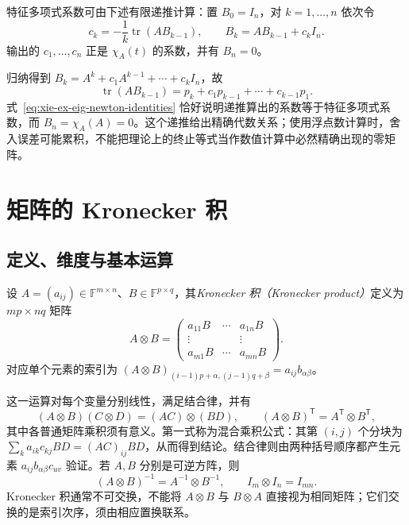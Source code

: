 \begin{example}
特征多项式系数可由下述有限递推计算：置 $B_0=I_n$，对 $k=1,\ldots,n$ 依次令
\begin{equation}
c_k=-\frac1k\operatorname{tr}(AB_{k-1}),\qquad
B_k=AB_{k-1}+c_kI_n.
\label{eq:xie-ex-eig-faddeev-leverrier}
\end{equation}
输出的 $c_1,\ldots,c_n$ 正是 $\chi_A(t)$ 的系数，并有 $B_n=0$。
\end{example}
\begin{solve}
归纳得到 $B_k=A^k+c_1A^{k-1}+\cdots+c_kI_n$，故
\[
\operatorname{tr}(AB_{k-1})=p_k+c_1p_{k-1}+\cdots+c_{k-1}p_1.
\]
式~\eqref{eq:xie-ex-eig-newton-identities} 恰好说明递推算出的系数等于特征多项式系数，而 $B_n=\chi_A(A)=0$。这个递推给出精确代数关系；使用浮点数计算时，舍入误差可能累积，不能把理论上的终止等式当作数值计算中必然精确出现的零矩阵。
\end{solve}

\section{矩阵的 Kronecker 积}
\label{sec:xie-ex-eig-kronecker}

\subsection{定义、维度与基本运算}

\begin{definition}
设 $A=(a_{ij})\in\mathbb F^{m\times n}$、$B\in\mathbb F^{p\times q}$，其\emph{Kronecker 积（Kronecker product）}定义为 $mp\times nq$ 矩阵
\[
A\otimes B=\begin{pmatrix}
a_{11}B&\cdots&a_{1n}B\\
\vdots&&\vdots\\
a_{m1}B&\cdots&a_{mn}B
\end{pmatrix}.
\]
对应单个元素的索引为 $(A\otimes B)_{(i-1)p+\alpha,(j-1)q+\beta}=a_{ij}b_{\alpha\beta}$。
\end{definition}

这一运算对每个变量分别线性，满足结合律，并有
\begin{equation}
(A\otimes B)(C\otimes D)=(AC)\otimes(BD),\qquad
(A\otimes B)^{\mathsf T}=A^{\mathsf T}\otimes B^{\mathsf T},
\label{eq:xie-ex-eig-kronecker-rules}
\end{equation}
其中各普通矩阵乘积须有意义。第一式称为混合乘积公式：其第 $(i,j)$ 个分块为 $\sum_k a_{ik}c_{kj}BD=(AC)_{ij}BD$，从而得到结论。结合律则由两种括号顺序都产生元素 $a_{ij}b_{\alpha\beta}c_{uv}$ 验证。若 $A,B$ 分别是可逆方阵，则
\[
(A\otimes B)^{-1}=A^{-1}\otimes B^{-1},\qquad
I_m\otimes I_n=I_{mn}.
\]
Kronecker 积通常不可交换，不能将 $A\otimes B$ 与 $B\otimes A$ 直接视为相同矩阵；它们交换的是索引次序，须由相应置换联系。

